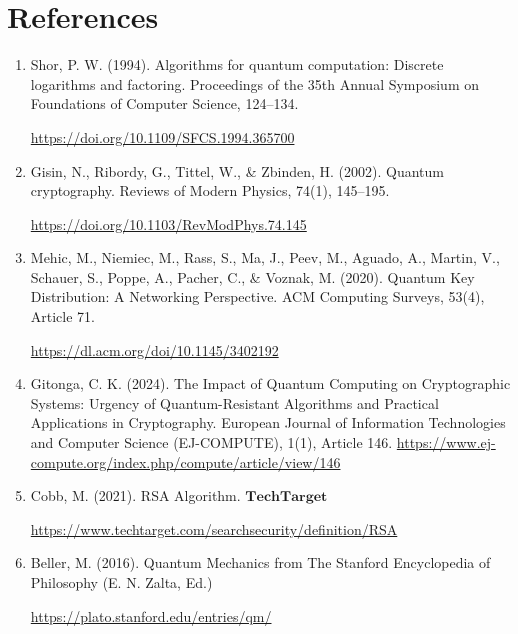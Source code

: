 \documentclass{article}
\begin{document}
\section*{References}
\begin{enumerate}
    \item Shor, P. W. (1994). Algorithms for quantum computation: Discrete logarithms and factoring. Proceedings of the 35th Annual Symposium on Foundations of Computer Science, 124–134. 
    
     \href{https://doi.org/10.1109/SFCS.1994.365700}{https://doi.org/10.1109/SFCS.1994.365700}
    \item Gisin, N., Ribordy, G., Tittel, W., \& Zbinden, H. (2002). Quantum cryptography. Reviews of Modern Physics, 74(1), 145–195. 
    
     \href{https://doi.org/10.1103/RevModPhys.74.145}{https://doi.org/10.1103/RevModPhys.74.145}
    \item Mehic, M., Niemiec, M., Rass, S., Ma, J., Peev, M., Aguado, A., Martin, V., Schauer, S., Poppe, A., Pacher, C., \& Voznak, M. (2020). Quantum Key Distribution: A Networking Perspective. ACM Computing Surveys, 53(4), Article 71. 
    
     \href{https://dl.acm.org/doi/10.1145/3402192}{https://dl.acm.org/doi/10.1145/3402192}

     \item Gitonga, C. K. (2024). The Impact of Quantum Computing on Cryptographic Systems: Urgency of Quantum-Resistant Algorithms and Practical Applications in Cryptography. European Journal of Information Technologies and Computer Science (EJ-COMPUTE), 1(1), Article 146.
     \href{https://www.ej-compute.org/index.php/compute/article/view/146}{https://www.ej-compute.org/index.php/compute/article/view/146}

     \item Cobb, M. (2021). RSA Algorithm. $\textbf{TechTarget}$
     
     \href{https://www.techtarget.com/searchsecurity/definition/RSA}{https://www.techtarget.com/searchsecurity/definition/RSA}
    \item Beller, M. (2016). Quantum Mechanics from The Stanford Encyclopedia of Philosophy (E. N. Zalta, Ed.)
    
   \href{https://plato.stanford.edu/entries/qm/}{https://plato.stanford.edu/entries/qm/} 

\end{enumerate}
\end{document}
